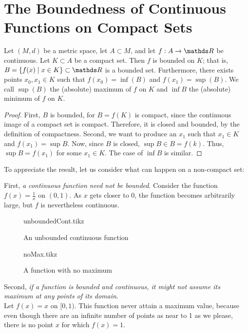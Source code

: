 \documentclass[../main-sheet.tex]{subfiles}
\begin{document}
\section{The Boundedness of Continuous Functions on Compact Sets}
\begin{thm}
    Let $ (M,d) $ be a metric space, let $ A\subset M $, and let $ f:A\to\R $ be continuous. Let $ K\subset A $ be a compact set. Then $ f $ is bounded on $ K $; that is, $ B=\set{f(x)\mid x\in K}\subset \R $ is a bounded set. Furthermore, there exists points $ x_0,x_1\in K $ such that $ f(x_0)=\inf(B) $ and $ f(x_1)=\sup(B) $. We call $ \sup(B) $ the (absolute) maximum of $ f $ on $ K $ and $ \inf B $ the (absolute) minimum of $ f $ on $ K $.
\end{thm}
\begin{proof}
    First, $ B $ is bounded, for $ B=f(K) $ is compact, since the continuous image of a compact set is compact. Therefore, it is closed and bounded, by the definition of compactness. Second, we want to produce an $ x_1 $ such that $ x_1\in K $ and $ f(x_1)=\sup B $. Now, since $ B $ is closed, $ \sup B\in B=f(k) $. Thus, $ \sup B=f(x_1) $ for some $ x_1\in K $. The case of $ \inf B $ is similar.
\end{proof}
To appreciate the result, let us consider what can happen on a non-compact set:
\begin{note}
    First, \emph{a continuous function need not be bounded}. Consider the function $ f(x)=\frac{1}{x} $ on $ (0,1) $. As $ x  $ gets closer to 0, the function becomes arbitrarily large, but $ f $ is nevertheless continuous.
\end{note}
\begin{figure}[H]
    \centering
    \begin{minipage}{0.45\textwidth}
        \centering
        {unboundedCont.tikz}
        \caption{An unbounded continuous function}
    \end{minipage}\hfill
    \begin{minipage}{0.45\textwidth}
        \centering
        {noMax.tikz}
        \caption{A function with no maximum}
    \end{minipage}
\end{figure}
\begin{note}
    Second, \emph{if a function is bounded and continuous, it might not assume its maximum at any points of its domain}.\\
    Let $ f(x)=x $ on $ [0,1) $. This function never attain a maximum value, because even though there are an infinite number of points as near to 1 as we please, there is no point $ x $ for which $ f(x)=1 $.
\end{note}
\end{document}
